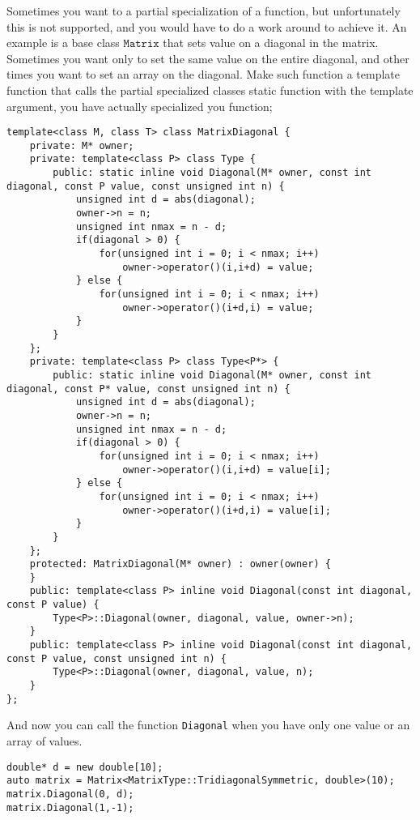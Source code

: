 \documentclass[11pt,english,a4paper]{article}
\begin{document}
\begin{flushleft}
Sometimes you want to a partial specialization of a function, but unfortunately this is not supported, and you would have to do a work around to achieve it. An example is a base class $\texttt{Matrix}$ that sets value on a diagonal in the matrix. Sometimes you want only to set the same value on the entire diagonal, and other times you want to set an array on the diagonal. Make such function a template function that calls the partial specialized classes static function with the template argument, you have actually specialized you function;

\begin{lstlisting}[title={Printing a matrix}]
template<class M, class T> class MatrixDiagonal {
    private: M* owner;
    private: template<class P> class Type {
        public: static inline void Diagonal(M* owner, const int diagonal, const P value, const unsigned int n) {
            unsigned int d = abs(diagonal);
            owner->n = n;
            unsigned int nmax = n - d;
            if(diagonal > 0) {
                for(unsigned int i = 0; i < nmax; i++)
                    owner->operator()(i,i+d) = value;
            } else {
                for(unsigned int i = 0; i < nmax; i++)
                    owner->operator()(i+d,i) = value;
            }
        }
    };
    private: template<class P> class Type<P*> {
        public: static inline void Diagonal(M* owner, const int diagonal, const P* value, const unsigned int n) {
            unsigned int d = abs(diagonal);
            owner->n = n;
            unsigned int nmax = n - d;
            if(diagonal > 0) {
                for(unsigned int i = 0; i < nmax; i++)
                    owner->operator()(i,i+d) = value[i];
            } else {
                for(unsigned int i = 0; i < nmax; i++)
                    owner->operator()(i+d,i) = value[i];
            }
        }
    };
    protected: MatrixDiagonal(M* owner) : owner(owner) {
    }
    public: template<class P> inline void Diagonal(const int diagonal, const P value) {
        Type<P>::Diagonal(owner, diagonal, value, owner->n);
    }
    public: template<class P> inline void Diagonal(const int diagonal, const P value, const unsigned int n) {
        Type<P>::Diagonal(owner, diagonal, value, n);
    }
};
\end{lstlisting} 

And now you can call the  function \texttt{Diagonal} when you have only one value or an array of values.  

\begin{lstlisting}[title={Printing a matrix}]
double* d = new double[10];
auto matrix = Matrix<MatrixType::TridiagonalSymmetric, double>(10);
matrix.Diagonal(0, d);
matrix.Diagonal(1,-1);
\end{lstlisting} 


\end{flushleft}
\end{document}
